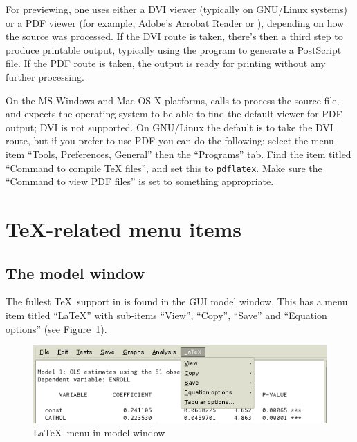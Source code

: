 For previewing, one uses either a DVI viewer (typically  on
GNU/Linux systems) or a PDF viewer (for example, Adobe's Acrobat
Reader or ), depending on how the source was processed.  If
the DVI route is taken, there's then a third step to produce printable
output, typically using the program  to generate a
PostScript file.  If the PDF route is taken, the output is ready for
printing without any further processing.

On the MS Windows and Mac OS X platforms,  calls
 to process the source file, and expects the operating
system to be able to find the default viewer for PDF output; DVI is
not supported.  On GNU/Linux the default is to take the DVI route, but
if you prefer to use PDF you can do the following: select the menu
item ``Tools, Preferences, General'' then the ``Programs'' tab.  Find
the item titled ``Command to compile TeX files'', and set this to
\texttt{pdflatex}.  Make sure the ``Command to view PDF files'' is set
to something appropriate.  

\section{\TeX-related menu items}
\label{tex-menus}

\subsection{The model window}

The fullest \TeX\ support in  is found in the GUI model
window.  This has a menu item titled ``LaTeX'' with sub-items
``View'', ``Copy'', ``Save'' and ``Equation options'' (see
Figure~\ref{fig:latex-menu}).  

\begin{figure}[htbp]
  \caption{\LaTeX\ menu in model window}
  \label{fig:latex-menu}
  \begin{center}
    \includegraphics[scale=0.75]{figures/latex_menu}
  \end{center}
\end{figure}

